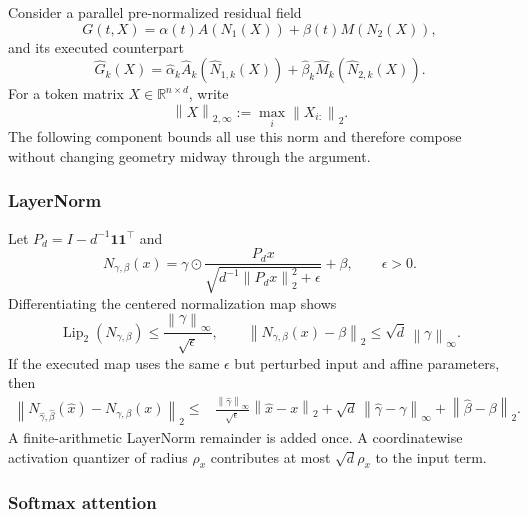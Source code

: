\documentclass[twoside,11pt]{article}
\newcommand{\norm}[1]{\left\lVert #1\right\rVert}
\newcommand{\one}{\mathbf{1}}
\begin{document}
Consider a parallel pre-normalized residual field
\begin{equation}
 G(t,X)=\alpha(t)A(N_1(X))+\beta(t)M(N_2(X)),
 \label{eq:transformer-field-main}
\end{equation}
and its executed counterpart
\begin{equation}
 \widehat G_k(X)=
 \widehat\alpha_k\widehat A_k(\widehat N_{1,k}(X))
 +\widehat\beta_k\widehat M_k(\widehat N_{2,k}(X)).
 \label{eq:transformer-executed-field-main}
\end{equation}
For a token matrix $X\in\mathbb R^{n\times d}$, write
\begin{equation}
 \norm X_{2,\infty}:=\max_i\norm{X_{i:}}_2.
 \label{eq:token-norm-main}
\end{equation}
The following component bounds all use this norm and therefore compose without changing geometry midway through the argument.

\subsubsection{LayerNorm}

Let $P_d=I-d^{-1}\one\one^\top$ and
\begin{equation}
 N_{\gamma,\beta}(x)
 =\gamma\odot\frac{P_dx}
 {\sqrt{d^{-1}\norm{P_dx}_2^2+\epsilon}}+\beta,
 \qquad\epsilon>0.
 \label{eq:layernorm-map-main}
\end{equation}
Differentiating the centered normalization map shows
\begin{equation}
 \operatorname{Lip}_2(N_{\gamma,\beta})
 \le\frac{\norm\gamma_\infty}{\sqrt\epsilon},
 \qquad
 \norm{N_{\gamma,\beta}(x)-\beta}_2
 \le\sqrt d\,\norm\gamma_\infty.
 \label{eq:layernorm-bounds-main}
\end{equation}
If the executed map uses the same $\epsilon$ but perturbed input and affine parameters, then
\begin{align}
 \norm{N_{\widehat\gamma,\widehat\beta}(\widehat x)
       -N_{\gamma,\beta}(x)}_2
 \le{}&\frac{\norm{\widehat\gamma}_\infty}{\sqrt\epsilon}
        \norm{\widehat x-x}_2
 +\sqrt d\,\norm{\widehat\gamma-\gamma}_\infty
 +\norm{\widehat\beta-\beta}_2.
 \label{eq:layernorm-error-main}
\end{align}
A finite-arithmetic LayerNorm remainder is added once.  A coordinatewise activation quantizer of radius $\rho_x$ contributes at most $\sqrt d\rho_x$ to the input term.

\subsubsection{Softmax attention}
\end{document}
